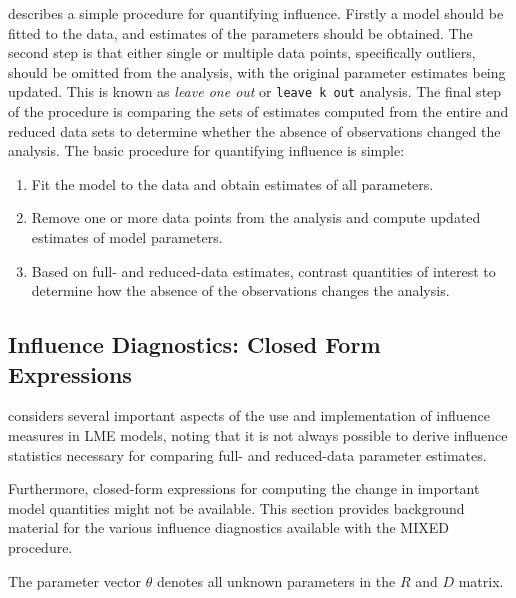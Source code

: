 \documentclass[12pt, a4paper]{report}
\theoremstyle{plain}
\theoremstyle{definition}
\theoremstyle{remark}
\begin{document}
	\citet{schabenberger} describes a simple procedure for quantifying influence. Firstly a model should be fitted to the data, and
	estimates of the parameters should be obtained. The second step is that either single or multiple data points, specifically outliers,
	should be omitted from the analysis, with the original parameter estimates being updated. This is known as \textit{leave one out} or \texttt{leave k out} analysis. The final step of the procedure is comparing the sets of estimates computed from the entire and reduced data sets to determine whether the absence of observations changed the
	analysis. The basic procedure for quantifying influence is simple:
	\begin{enumerate}
		\item Fit the model to the data and obtain estimates of all parameters.
		\item Remove one or more data points from the analysis and compute updated estimates of model parameters.
		\item Based on full- and reduced-data estimates, contrast quantities of interest to determine how the absence
		of the observations changes the analysis.
	\end{enumerate}	
	
	
	

\subsection{Influence Diagnostics: Closed Form Expressions} %

\citet{schabenberger} considers several important aspects of the use and implementation of influence measures in LME models, noting that it is not always possible to
derive influence statistics necessary for comparing full- and reduced-data parameter estimates. 




Furthermore, closed-form expressions for computing the change in important model quantities might not be available.
This section provides background material for the various influence diagnostics available with the MIXED procedure.

The parameter vector $\theta$ denotes all unknown parameters in the  $R$ and $D$  matrix.
\end{document}

